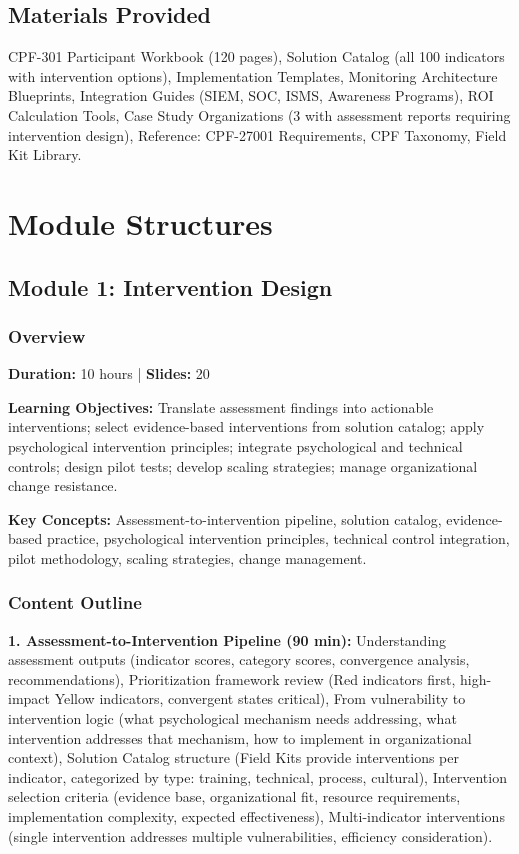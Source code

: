 \documentclass[11pt,a4paper]{article}
\begin{document}
\subsection{Materials Provided}

CPF-301 Participant Workbook (120 pages), Solution Catalog (all 100 indicators with intervention options), Implementation Templates, Monitoring Architecture Blueprints, Integration Guides (SIEM, SOC, ISMS, Awareness Programs), ROI Calculation Tools, Case Study Organizations (3 with assessment reports requiring intervention design), Reference: CPF-27001 Requirements, CPF Taxonomy, Field Kit Library.

\newpage

\section{Module Structures}

\subsection{Module 1: Intervention Design}

\subsubsection{Overview}

\textbf{Duration:} 10 hours | \textbf{Slides:} 20

\textbf{Learning Objectives:} Translate assessment findings into actionable interventions; select evidence-based interventions from solution catalog; apply psychological intervention principles; integrate psychological and technical controls; design pilot tests; develop scaling strategies; manage organizational change resistance.

\textbf{Key Concepts:} Assessment-to-intervention pipeline, solution catalog, evidence-based practice, psychological intervention principles, technical control integration, pilot methodology, scaling strategies, change management.

\subsubsection{Content Outline}

\textbf{1. Assessment-to-Intervention Pipeline (90 min):} Understanding assessment outputs (indicator scores, category scores, convergence analysis, recommendations), Prioritization framework review (Red indicators first, high-impact Yellow indicators, convergent states critical), From vulnerability to intervention logic (what psychological mechanism needs addressing, what intervention addresses that mechanism, how to implement in organizational context), Solution Catalog structure (Field Kits provide interventions per indicator, categorized by type: training, technical, process, cultural), Intervention selection criteria (evidence base, organizational fit, resource requirements, implementation complexity, expected effectiveness), Multi-indicator interventions (single intervention addresses multiple vulnerabilities, efficiency consideration).
\end{document}
